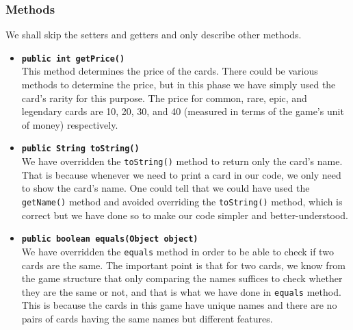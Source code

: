\documentclass[a4paper]{article}
\begin{document}
\subsubsection{Methods}
We shall skip the setters and getters and only describe other methods.
\begin{itemize}
	\item \texttt{\textbf{public int getPrice()}}\\
		This method determines the price of the cards. There could be various methods to determine the price, but in this phase we have simply used the card's rarity for this purpose. The price for common, rare, epic, and legendary cards are 10, 20, 30, and 40 (measured in terms of the game's unit of money) respectively.
		
		\item \texttt{\textbf{public String toString()}}\\
		We have overridden the \texttt{toString()} method to return only the card's name. That is because whenever we need to print a card in our code, we only need to show the card's name. One could tell that we could have used the \texttt{getName()} method and avoided overriding the \texttt{toString()} method, which is correct but we have done so to make our code simpler and better-understood.
		
		\item \texttt{\textbf{public boolean equals(Object object)}}\\
		We have overridden the \texttt{equals} method in order to be able to check if two cards are the same. The important point is that for two cards, we know from the game structure that only comparing the names suffices to check whether they are the same or not, and that is what we have done in \texttt{equals} method. This is because the cards in this game have unique names and there are no pairs of cards having the same names but different features.
\end{itemize}
\end{document}
